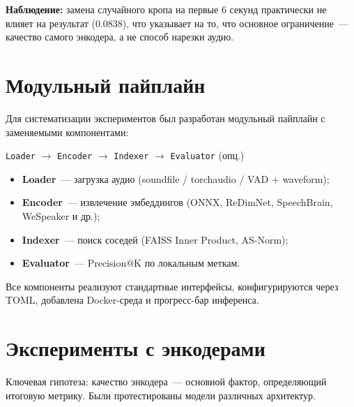 \documentclass[12pt,a4paper]{article}
\begin{document}
\textbf{Наблюдение:} замена случайного кропа на первые 6 секунд практически не влияет на результат (0.0838), что указывает на то, что основное ограничение~--- качество самого энкодера, а не способ нарезки аудио.

\section{Модульный пайплайн}

Для систематизации экспериментов был разработан модульный пайплайн с заменяемыми компонентами:

\begin{center}
\texttt{Loader} $\rightarrow$ \texttt{Encoder} $\rightarrow$ \texttt{Indexer} $\rightarrow$ \texttt{Evaluator} (опц.)
\end{center}

\begin{itemize}
  \item \textbf{Loader}~--- загрузка аудио (soundfile / torchaudio / VAD + waveform);
  \item \textbf{Encoder}~--- извлечение эмбеддингов (ONNX, ReDimNet, SpeechBrain, WeSpeaker и др.);
  \item \textbf{Indexer}~--- поиск соседей (FAISS Inner Product, AS-Norm);
  \item \textbf{Evaluator}~--- Precision@K по локальным меткам.
\end{itemize}

Все компоненты реализуют стандартные интерфейсы, конфигурируются через TOML, добавлена Docker-среда и прогресс-бар инференса.

\section{Эксперименты с энкодерами}

Ключевая гипотеза: качество энкодера~--- основной фактор, определяющий итоговую метрику. Были протестированы модели различных архитектур.
\end{document}
